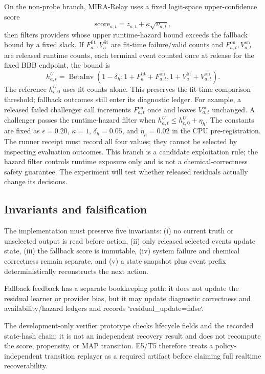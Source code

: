\documentclass[sigconf,anonymous]{aamas}
\begin{document}
On the non-probe branch, MIRA-Relay uses a fixed logit-space upper-confidence score
$$
\mathrm{score}_{a,t}=z_{a,t}+\kappa\sqrt{\upsilon_{a,t}},
$$
then filters providers whose upper runtime-hazard bound exceeds the fallback bound by a fixed slack. If
$F^{\mathrm{fit}}_a,V^{\mathrm{fit}}_a$ are fit-time failure/valid counts and
$F^{\mathrm{on}}_{a,t},V^{\mathrm{on}}_{a,t}$ are released runtime counts, each terminal event
counted once at release for the fixed BBB endpoint, the bound is
$$
h^U_{a,t}=\operatorname{BetaInv}\!\left(1-\delta_h;
1+F^{\mathrm{fit}}_a+F^{\mathrm{on}}_{a,t},
1+V^{\mathrm{fit}}_a+V^{\mathrm{on}}_{a,t}\right).
$$
The reference $h^U_{c,0}$ uses fit counts alone. This preserves the fit-time comparison threshold; fallback outcomes still enter its diagnostic ledger. For example, a released failed challenger call increments $F^{\mathrm{on}}_{a,t}$ once and leaves $V^{\mathrm{on}}_{a,t}$ unchanged. A challenger passes the runtime-hazard filter when
$h^U_{a,t}\leq h^U_{c,0}+\eta_h$. The constants are fixed as $\epsilon=0.20$, $\kappa=1$, $\delta_h=0.05$, and $\eta_h=0.02$ in the CPU pre-registration. The runner receipt must record all four values; they cannot be selected by inspecting evaluation outcomes. This branch
is a candidate exploitation rule; the hazard filter controls runtime exposure only and is not a
chemical-correctness safety guarantee. The experiment will test whether released residuals actually
change its decisions.

\subsection{Invariants and falsification}
The implementation must preserve five invariants: (i) no current truth or unselected output is read before action, (ii) only released selected events update state, (iii) the fallback score is immutable, (iv) system failure and chemical correctness remain separate, and (v) a state snapshot plus event prefix deterministically reconstructs the next action.

Fallback feedback has a separate bookkeeping path: it does not update the residual learner or provider bias, but it may update diagnostic correctness and availability/hazard ledgers and records `residual\_update=false`.

The development-only verifier prototype checks lifecycle fields and the recorded state-hash chain; it is not an independent recovery result and does not recompute the score, propensity, or MAP transition. E5/T5 therefore treats a policy-independent transition replayer as a required artifact before claiming full realtime recoverability.
\end{document}
